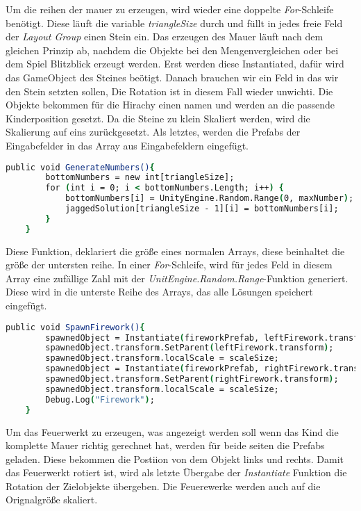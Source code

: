 Um die reihen der mauer zu erzeugen, wird wieder eine doppelte \textit{For}-Schleife benötigt. Diese läuft die variable \textit{triangleSize} durch und füllt in jedes freie Feld der \textit{Layout Group} einen Stein ein. Das erzeugen des Mauer läuft nach dem gleichen Prinzip ab, nachdem die Objekte bei den Mengenvergleichen oder bei dem Spiel Blitzblick erzeugt werden. Erst werden diese Instantiated, dafür wird das GameObject des Steines beötigt. Danach brauchen wir ein Feld in das wir den Stein setzten sollen, Die Rotation ist in diesem Fall wieder unwichti. Die Objekte bekommen für die Hirachy einen namen und werden an die passende Kinderposition gesetzt. Da die Steine zu klein Skaliert werden, wird die Skalierung auf eins zurückgesetzt. Als letztes, werden die Prefabs der Eingabefelder in das Array aus Eingabefeldern eingefügt.\\
\begin{lstlisting}[language=csh, caption={Triangle.cs GenerateNumbers-Funktion}]
	public void GenerateNumbers(){
		bottomNumbers = new int[triangleSize];
		for (int i = 0; i < bottomNumbers.Length; i++) {
			bottomNumbers[i] = UnityEngine.Random.Range(0, maxNumber);
			jaggedSolution[triangleSize - 1][i] = bottomNumbers[i];
		}
	}
\end{lstlisting}
Diese Funktion, deklariert die größe eines normalen Arrays, diese beinhaltet die größe der untersten reihe. In einer \textit{For}-Schleife, wird für jedes Feld in diesem Array eine zufällige Zahl mit der \textit{UnitEngine.Random.Range}-Funktion generiert. Diese wird in die unterste Reihe des Arrays, das alle Lösungen speichert eingefügt.\\
\begin{lstlisting}[language=csh, caption={Triangle.cs SpawnFirework-Funktion}]
	public void SpawnFirework(){
		spawnedObject = Instantiate(fireworkPrefab, leftFirework.transform.position, leftFirework.transform.rotation);
		spawnedObject.transform.SetParent(leftFirework.transform);
		spawnedObject.transform.localScale = scaleSize;
		spawnedObject = Instantiate(fireworkPrefab, rightFirework.transform.position, rightFirework.transform.rotation);
		spawnedObject.transform.SetParent(rightFirework.transform);
		spawnedObject.transform.localScale = scaleSize;
		Debug.Log("Firework");
	}
\end{lstlisting}
Um das Feuerwerkt zu erzeugen, was angezeigt werden soll wenn das Kind die komplette Mauer richtig gerechnet hat, werden für beide seiten die Prefabs geladen. Diese bekommen die Postiion von dem Objekt links und rechts. Damit das Feuerwerkt rotiert ist, wird als letzte Übergabe der \textit{Instantiate} Funktion die Rotation der Zielobjekte übergeben. Die Feuerewerke werden auch auf die Orignalgröße skaliert.\\
